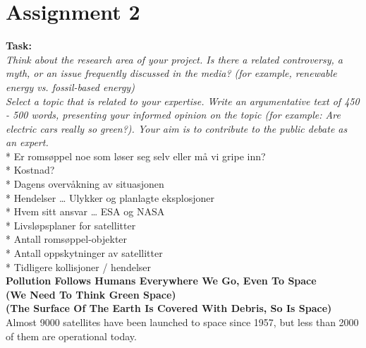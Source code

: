 \section{Assignment 2}

\textbf{Task:} \\
\textit{Think about the research area of your project. Is there a related controversy, a myth, or an issue frequently discussed in the media? (for example, renewable energy vs. fossil-based energy) } \\

\textit{Select a topic that is related to your expertise. Write an argumentative text of 450 - 500 words, presenting your informed opinion on the topic (for example: Are electric cars really so green?). Your aim is to contribute to the public debate as an expert. }  \\


* Er romsøppel noe som løser seg selv eller må vi gripe inn? \\

* Kostnad? \\

* Dagens overvåkning av situasjonen \\

* Hendelser … Ulykker og planlagte eksplosjoner \\

* Hvem sitt ansvar … ESA og NASA \\

* Livsløpsplaner for satellitter \\

* Antall romsøppel-objekter  \\

* Antall oppskytninger av satellitter \\

* Tidligere kollisjoner / hendelser \\




\textbf{Pollution Follows Humans Everywhere We Go, Even To Space} \\

\textbf{(We Need To Think Green Space)} \\

\textbf{(The Surface Of The Earth Is Covered With Debris, So Is Space)} \\


Almost 9000 satellites have been launched to space since 1957, but less than 2000 of them are operational today\cite{ESA_space_debris_figures}. \\


